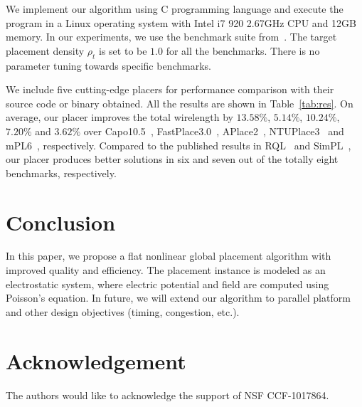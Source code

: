 \documentclass[conference,10pt]{IEEEtran}
\begin{document}
We implement our algorithm 
using C programming language and 
execute the program in a
Linux operating system with Intel i7 920 2.67GHz CPU
and 12GB memory. 
In our experiments, 
we use the benchmark suite from~\cite{ispd05}.
The target placement density $\rho_t$ is set 
to be $1.0$ for all the benchmarks.
There is no parameter tuning towards specific benchmarks.

We include 
five cutting-edge placers for performance comparison 
with their source code or binary obtained. 
All the results are shown in Table~\ref{tab:res}.
On average, our placer improves the total wirelength by
$13.58\%$,
$5.14\%$,
$10.24\%$,
$7.20\%$ and 
$3.62\%$ 
over
Capo10.5~\cite{capo}, 
FastPlace3.0~\cite{fp3},
APlace2~\cite{aplace2},
NTUPlace3~\cite{ntupl3} and 
mPL6~\cite{mpl6}, 
respectively.
Compared to the published results in 
RQL~\cite{rql} and SimPL~\cite{simpl}, 
our placer produces better solutions  
in six and seven out of the totally eight
benchmarks, respectively.
















\section{Conclusion}
\label{sec:conc}
\vspace{-0.05in}

In this paper, 
we propose a flat nonlinear global placement algorithm 
with improved quality and efficiency. 
The placement instance is modeled as an electrostatic system, 
where electric potential and field are computed using Poisson's equation. 
In future, we will extend our algorithm to parallel platform 
and other design objectives (timing, congestion, etc.).



\section{Acknowledgement}
\label{sec:ack}
The authors would like to acknowledge the support of NSF CCF-1017864.




\end{document}
